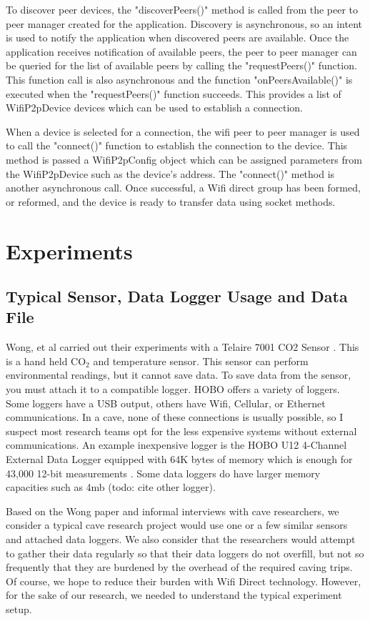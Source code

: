 \documentclass[10pt,twocolumn]{article}
\begin{document}
To discover peer devices, the "discoverPeers()" method is called from the peer to peer manager created for the application.
Discovery is asynchronous, so an intent is used to notify the application when discovered peers are available.
Once the application receives notification of available peers, the peer to peer manager can be queried for the list of available peers by calling the "requestPeers()" function. 
This function call is also asynchronous and the function "onPeersAvailable()" is executed when the "requestPeers()" function succeeds. 
This provides a list of WifiP2pDevice devices which can be used to establish a connection. \cite{androidp2p}

When a device is selected for a connection, the wifi peer to peer manager is used to call the "connect()" function to establish the connection to the device. 
This method is passed a WifiP2pConfig object which can be assigned parameters from the WifiP2pDevice such as the device's address.
The "connect()" method is another asynchronous call. 
Once successful, a Wifi direct group has been formed, or reformed, and the device is ready to transfer data using socket methods.

\section{Experiments}

\subsection{Typical Sensor, Data Logger Usage and Data File}
Wong, et al carried out their experiments with a Telaire 7001 CO2 Sensor \cite{telaire} \cite{wong2010}. 
This is a hand held CO$_2$ and temperature sensor.
This sensor can perform environmental readings, but it cannot save data.
To save data from the sensor, you must attach it to a compatible logger.
HOBO offers a variety of loggers.
Some loggers have a USB output, others have Wifi, Cellular, or Ethernet communications.
In a cave, none of these connections is usually possible, so I suspect most research teams opt for the less expensive systems without external communications.
An example inexpensive logger is the HOBO U12 4-Channel External Data Logger equipped with 64K bytes of memory which is enough for 43,000 12-bit measurements \cite{logger}. 
Some data loggers do have larger memory capacities such as 4mb (todo: cite other logger).

Based on the Wong paper and informal interviews with cave researchers, we consider a typical cave research project would use one or a few similar sensors and attached data loggers.
We also consider that the researchers would attempt to gather their data regularly so that their data loggers do not overfill, but not so frequently that they are burdened by the overhead of the required caving trips.
Of course, we hope to reduce their burden with Wifi Direct technology.
However, for the sake of our research, we needed to understand the typical experiment setup.
\end{document}
